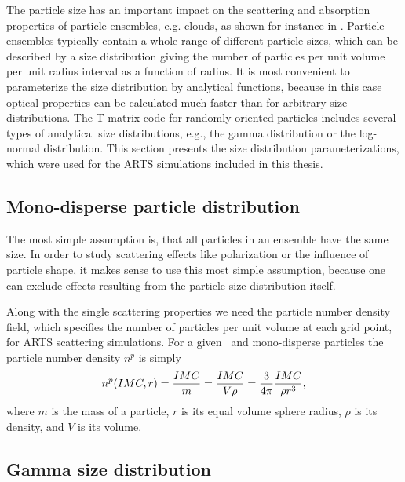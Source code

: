 The particle size has an important impact on the scattering and
absorption properties of particle ensembles, e.g. clouds, as shown for instance
in \citep{emde04:_doit_jgr}.  Particle ensembles typically contain a whole range
of different particle sizes, which can be described by a size
distribution giving the number of particles per unit volume per unit
radius interval as a function of radius.  It is most convenient to
parameterize the size distribution by analytical functions, because in
this case optical properties can be calculated much faster than for
arbitrary size distributions. The T-matrix code for randomly oriented
particles includes several types of analytical size distributions,
e.g., the gamma distribution or the log-normal distribution.  This
section presents the size distribution parameterizations, which were
used for the ARTS simulations included in this thesis.

\subsection{Mono-disperse particle distribution}

The most simple assumption is, that all particles in an ensemble have
the same size.  In order to study scattering effects like polarization
or the influence of particle shape, it makes sense to use this most
simple assumption, because one can exclude effects resulting from the
particle size distribution itself.  

Along with the single scattering properties we need the particle
number density field, which specifies the number of particles per
unit volume at each grid point, for ARTS scattering simulations.  For
a given \imc\ and mono-disperse particles the particle number density
$n^p$ is simply
\begin{equation}
\label{eq:pnd_mono}
  n^p (IMC, r) =\frac{IMC}{m} = \frac{IMC}{V\rho}
    =\frac{3}{4\pi}\frac{IMC}{\rho r^3},  
\end{equation}
where $m$ is the mass of a particle, $r$ is its equal volume sphere
radius, $\rho$ is its density, and $V$ is its volume.
     
\subsection{Gamma size distribution}
\label{sec:clouds:gamma_distr}

